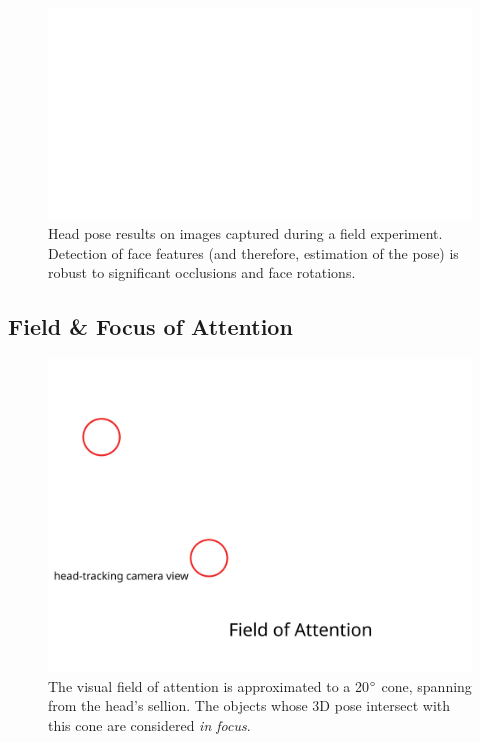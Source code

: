 \documentclass{sig-alternate}
\begin{document}
\begin{figure}[t]
    \centering
    \includegraphics[width=\linewidth]{head_pose_real_world}
    \caption{Head pose results on images captured during a field experiment.
    Detection of face features (and therefore, estimation of the pose) is robust
    to significant occlusions and face rotations.}
    \label{head_pose_real_world}
\end{figure}

\subsection{Field \& Focus of Attention}

\begin{figure}
    \centering
    \includegraphics[width=0.9\columnwidth]{field_of_attention}
    \caption{\small The visual field of attention is approximated to a
        20$\degree$ cone, spanning from the head's sellion. The objects whose 3D
    pose intersect with this cone are considered \emph{in focus}.}
    \label{fig:vfoa}
\end{figure}
\end{document}
